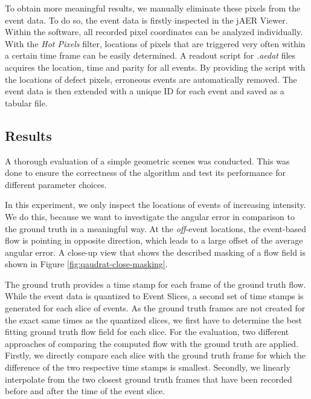 To obtain more meaningful results, we manually eliminate these pixels from the event data.
To do so, the event data is firstly inspected in the jAER Viewer. 
Within the software, all recorded pixel coordinates can be analyzed individually.
With the \textit{Hot Pixels} filter, locations of pixels that are triggered very often within a certain time frame can be easily determined.
A readout script for \textit{.aedat} files acquires the location, time and parity for all events.
By providing the script with the locations of defect pixels, erroneous events are automatically removed.
The event data is then extended with a unique ID for each event and saved as a tabular file.


\subsection{Results}
A thorough evaluation of a simple geometric scenes was conducted.
This was done to ensure the correctness of the algorithm and test its performance for different parameter choices.

In this experiment, we only inspect the locations of events of increasing intensity.
We do this, because we want to investigate the angular error in comparison to the ground truth in a meaningful way. 
At the \textit{off}-event locations, the event-based flow is pointing in opposite direction, which leads to a large offset of the average angular error. 
A close-up view that shows the described masking of a flow field is shown in Figure \ref{fig:qaudrat-close-masking}.


The ground truth provides a time stamp for each frame of the ground truth flow.
While the event data is quantized to Event Slices, a second set of time stamps is generated for each slice of events.
As the ground truth frames are not created for the exact same times as the quantized slices, we first have to determine the best fitting ground truth flow field for each slice.
For the evaluation, two different approaches of comparing the computed flow with the ground truth are applied.
Firstly, we directly compare each slice with the ground truth frame for which the difference of the two respective time stamps is smallest.
Secondly, we linearly interpolate from the two closest ground truth frames that have been recorded before and after the time of the event slice.


